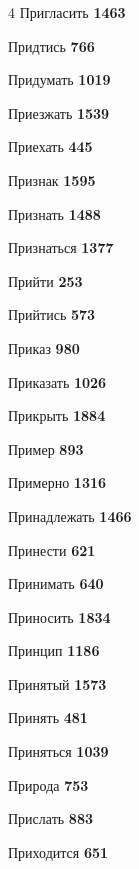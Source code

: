 \begin{multicols}{4}
\noindent Пригласить \dotfill \textbf{\color{secondary} 1463}\par
\noindent Придтись \dotfill \textbf{\color{secondary} 766}\par
\noindent Придумать \dotfill \textbf{\color{secondary} 1019}\par
\noindent Приезжать \dotfill \textbf{\color{secondary} 1539}\par
\noindent Приехать \dotfill \textbf{\color{secondary} 445}\par
\noindent Признак \dotfill \textbf{\color{secondary} 1595}\par
\noindent Признать \dotfill \textbf{\color{secondary} 1488}\par
\noindent Признаться \dotfill \textbf{\color{secondary} 1377}\par
\noindent Прийти \dotfill \textbf{\color{secondary} 253}\par
\noindent Прийтись \dotfill \textbf{\color{secondary} 573}\par
\noindent Приказ \dotfill \textbf{\color{secondary} 980}\par
\noindent Приказать \dotfill \textbf{\color{secondary} 1026}\par
\noindent Прикрыть \dotfill \textbf{\color{secondary} 1884}\par
\noindent Пример \dotfill \textbf{\color{secondary} 893}\par
\noindent Примерно \dotfill \textbf{\color{secondary} 1316}\par
\noindent Принадлежать \dotfill \textbf{\color{secondary} 1466}\par
\noindent Принести \dotfill \textbf{\color{secondary} 621}\par
\noindent Принимать \dotfill \textbf{\color{secondary} 640}\par
\noindent Приносить \dotfill \textbf{\color{secondary} 1834}\par
\noindent Принцип \dotfill \textbf{\color{secondary} 1186}\par
\noindent Принятый \dotfill \textbf{\color{secondary} 1573}\par
\noindent Принять \dotfill \textbf{\color{secondary} 481}\par
\noindent Приняться \dotfill \textbf{\color{secondary} 1039}\par
\noindent Природа \dotfill \textbf{\color{secondary} 753}\par
\noindent Прислать \dotfill \textbf{\color{secondary} 883}\par
\noindent Приходится \dotfill \textbf{\color{secondary} 651}\par

\end{multicols}
